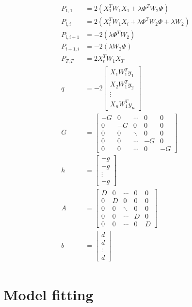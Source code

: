 \documentclass{article}
\theoremstyle{plain}
\theoremstyle{definition}
\theoremstyle{remark}
\begin{document}
\begin{equation}
\begin{split}
P_{1,1} &= 2(X_1^T W_1 X_1 + \lambda \Phi^T W_2 \Phi)\\
P_{i,i} &= 2(X_i^T W_1 X_i + \lambda \Phi^T W_2 \Phi + \lambda W_2)\\
P_{i, i+1} &= -2( \lambda \Phi^T W_2)\\
P_{i+1, i} &= - 2(\lambda W_2 \Phi)\\
P_{T,T} &= 2X^T_t W_1 X_T\\
q &= 
-2\left[
\begin{array}{c}
X_1 W_1^T y_1\\
X_2 W_1^T y_2\\
\vdots\\
X_n W_1^T y_n
\end{array}
\right]\\
G &= \left[
\begin{array}{ccccc}
-G&0&\cdots&0&0\\
0&-G&0&0&0\\
0&0&\ddots&0&0\\
0&0&\cdots&-G&0\\
0&0&\cdots&0&-G
\end{array}
\right]\\
h &= 
\left[
\begin{array}{c}
-g\\
-g\\
\vdots\\
-g
\end{array}
\right]\\
A &= \left[
\begin{array}{ccccc}
D&0&\cdots&0&0\\
0&D&0&0&0\\
0&0&\ddots&0&0\\
0&0&\cdots&D&0\\
0&0&\cdots&0&D
\end{array}
\right]\\
b &= 
\left[
\begin{array}{c}
d\\
d\\
\vdots\\
d
\end{array}
\right]\\
\end{split}
\end{equation}


\section{Model fitting}
\end{document}
